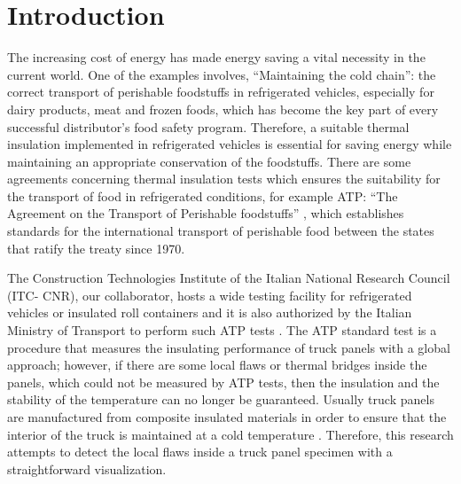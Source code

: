 

% 

\newpage
\section{Introduction}

The increasing cost of energy has made energy saving a vital necessity in the current world. One of the examples involves, “Maintaining the cold chain”: the correct transport of perishable foodstuffs in refrigerated vehicles, especially for dairy products, meat and frozen foods, which has become the key part of every successful distributor’s food safety program. Therefore, a suitable thermal insulation implemented in refrigerated vehicles is essential for saving energy while maintaining an appropriate conservation of the foodstuffs. There are some agreements concerning thermal insulation tests which ensures the suitability for the transport of food in refrigerated conditions, for example ATP: “The Agreement on the Transport of Perishable foodstuffs” \citet{Geneva1970}, which establishes standards for the international transport of perishable food between the states that ratify the treaty since 1970.

The Construction Technologies Institute of the Italian National Research Council (ITC- CNR), our collaborator, hosts a wide testing facility for refrigerated vehicles or insulated roll containers and it is also authorized by the Italian Ministry of Transport to perform such ATP tests \citet{Tassou2009,dragano2009experimental}. The ATP standard test is a procedure that measures the insulating performance of truck panels with a global approach; however, if there are some local flaws or thermal bridges inside the panels, which could not be measured by ATP tests, then the insulation and the stability of the temperature can no longer be guaranteed. Usually truck panels are manufactured from composite insulated materials in order to ensure that the interior of the truck is maintained at a cold temperature \citet{bortolin2015mapping}. Therefore, this research attempts to detect the local flaws inside a truck panel specimen with a straightforward visualization.


